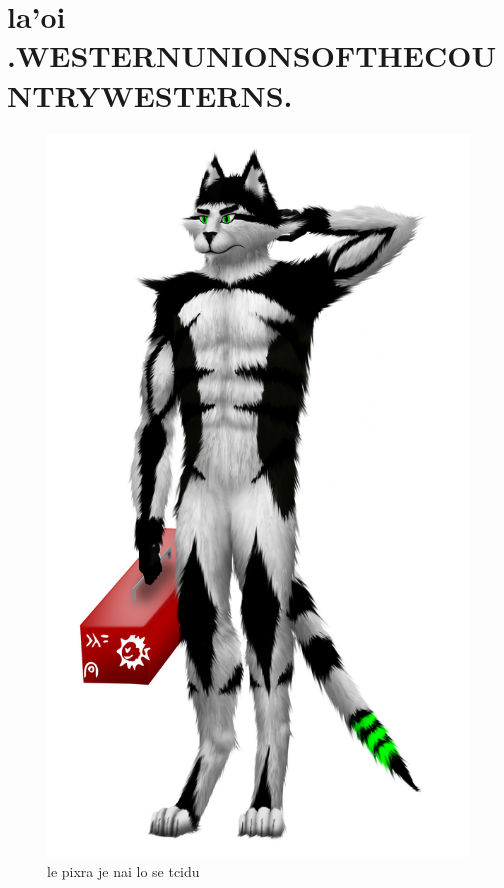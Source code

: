 \documentclass{report}
\begin{document}
\chapter{la'oi .WESTERNUNIONSOFTHECOUNTRYWESTERNS.}
\begin{figure}[ht]
	\centering
	\includegraphics[keepaspectratio, width=\textwidth, height=0.75\textheight]{50x/toolbox/westernunionsofthecountrywesterns.png}
	\caption[center]{le pixra je nai lo se tcidu}
\end{figure}
\end{document}
